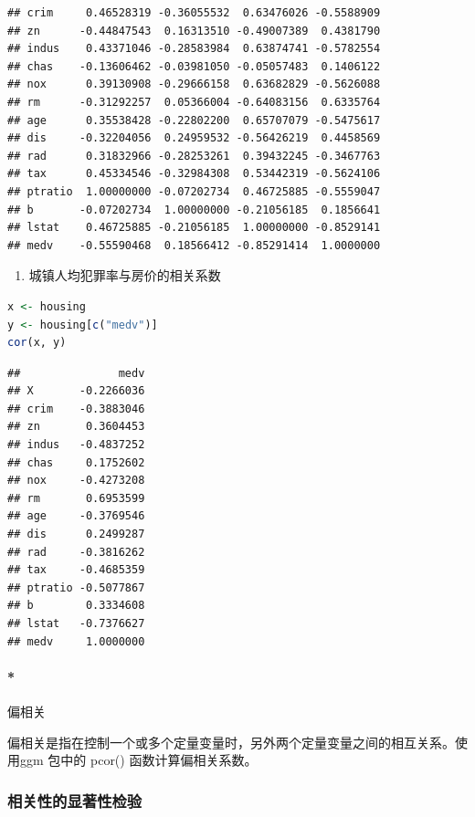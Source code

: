 \documentclass[]{ctexbook}
\providecommand{\tightlist}{%
  \setlength{\itemsep}{0pt}\setlength{\parskip}{0pt}}
\let\oldparagraph\paragraph
\renewcommand{\paragraph}[1]{\oldparagraph{#1}\mbox{}}
\begin{document}
\begin{lstlisting}
## crim     0.46528319 -0.36055532  0.63476026 -0.5588909
## zn      -0.44847543  0.16313510 -0.49007389  0.4381790
## indus    0.43371046 -0.28583984  0.63874741 -0.5782554
## chas    -0.13606462 -0.03981050 -0.05057483  0.1406122
## nox      0.39130908 -0.29666158  0.63682829 -0.5626088
## rm      -0.31292257  0.05366004 -0.64083156  0.6335764
## age      0.35538428 -0.22802200  0.65707079 -0.5475617
## dis     -0.32204056  0.24959532 -0.56426219  0.4458569
## rad      0.31832966 -0.28253261  0.39432245 -0.3467763
## tax      0.45334546 -0.32984308  0.53442319 -0.5624106
## ptratio  1.00000000 -0.07202734  0.46725885 -0.5559047
## b       -0.07202734  1.00000000 -0.21056185  0.1856641
## lstat    0.46725885 -0.21056185  1.00000000 -0.8529141
## medv    -0.55590468  0.18566412 -0.85291414  1.0000000
\end{lstlisting}

\begin{enumerate}
\def\labelenumi{\arabic{enumi}.}
\setcounter{enumi}{2}
\tightlist
\item
  城镇人均犯罪率与房价的相关系数
\end{enumerate}

\begin{lstlisting}[language=R]
x <- housing
y <- housing[c("medv")]
cor(x, y)
\end{lstlisting}

\begin{lstlisting}
##               medv
## X       -0.2266036
## crim    -0.3883046
## zn       0.3604453
## indus   -0.4837252
## chas     0.1752602
## nox     -0.4273208
## rm       0.6953599
## age     -0.3769546
## dis      0.2499287
## rad     -0.3816262
## tax     -0.4685359
## ptratio -0.5077867
## b        0.3334608
## lstat   -0.7376627
## medv     1.0000000
\end{lstlisting}

\hypertarget{ux504fux76f8ux5173}{%
\paragraph*{偏相关}\label{ux504fux76f8ux5173}}

偏相关是指在控制一个或多个定量变量时，另外两个定量变量之间的相互关系。使用ggm 包中的 pcor() 函数计算偏相关系数。

\hypertarget{ux76f8ux5173ux6027ux7684ux663eux8457ux6027ux68c0ux9a8c}{%
\subsubsection{相关性的显著性检验}\label{ux76f8ux5173ux6027ux7684ux663eux8457ux6027ux68c0ux9a8c}}
\end{document}
